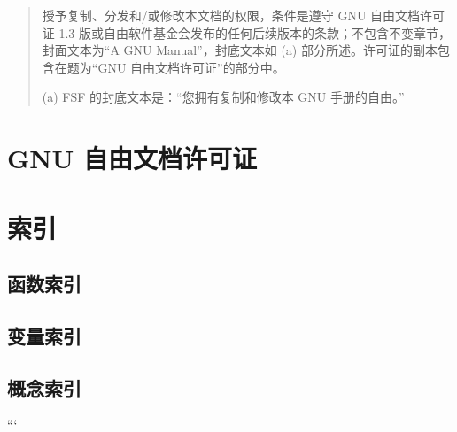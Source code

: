 \documentclass[11pt]{ctexart}
\begin{document}
\begin{quote}
授予复制、分发和/或修改本文档的权限，条件是遵守 GNU 自由文档许可证 1.3 版或自由软件基金会发布的任何后续版本的条款；不包含不变章节，封面文本为“A GNU Manual”，封底文本如 (a) 部分所述。许可证的副本包含在题为“GNU 自由文档许可证”的部分中。

(a) FSF 的封底文本是：“您拥有复制和修改本 GNU 手册的自由。”
\end{quote}
\section{GNU 自由文档许可证}
\label{sec:org2685c88}
\section{索引}
\label{sec:org07d5484}
\subsection{函数索引}
\label{sec:orga2eecfa}
\subsection{变量索引}
\label{sec:orga157eb7}
\subsection{概念索引}
\label{sec:org9959451}
```
\end{document}
